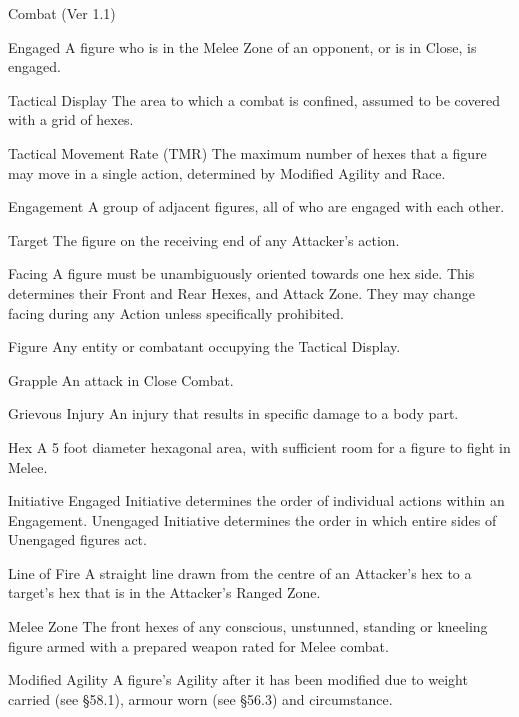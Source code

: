 \begin{Chapter}{Combat (Ver 1.1)}
\begin{Description}
\item[Engaged] A figure who is in the Melee Zone of an opponent, or is
  in Close, is engaged.

\item[Tactical Display] The area to which a combat is confined,
  assumed to be covered with a grid of hexes.

\item[Tactical Movement Rate (TMR)] The maximum number of hexes that a
  figure may move in a single action, determined by Modified Agility
  and Race.

\item[Engagement] A group of adjacent figures, all of who are engaged
  with each other.

\item[Target] The figure on the receiving end of any Attacker’s
  action.

\item[Facing] A figure must be unambiguously oriented towards one hex
  side.  This determines their Front and Rear Hexes, and Attack Zone.
  They may change facing during any Action unless specifically
  prohibited.

\item[Figure] Any entity or combatant occupying the Tactical Display.

\item[Grapple] An attack in Close Combat.

\item[Grievous Injury] An injury that results in specific damage to a
  body part.

\item[Hex] A 5 foot diameter hexagonal area, with sufficient room for
  a figure to fight in Melee.

\item[Initiative] Engaged Initiative determines the order of
  individual actions within an Engagement. Unengaged Initiative
  determines the order in which entire sides of Unengaged figures act.

\item[Line of Fire] A straight line drawn from the centre of an
  Attacker’s hex to a target’s hex that is in the Attacker’s Ranged
  Zone.

\item[Melee Zone] The front hexes of any conscious, unstunned,
  standing or kneeling figure armed with a prepared weapon rated for
  Melee combat.

\item[Modified Agility] A figure’s Agility after it has been modified
  due to weight carried (see §58.1), armour worn (see §56.3) and
  circumstance.


\end{Description}
\end{Chapter}
